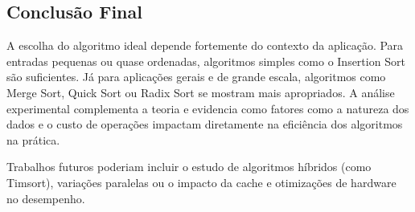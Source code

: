 \subsection*{Conclusão Final}

A escolha do algoritmo ideal depende fortemente do contexto da aplicação. Para entradas pequenas ou quase ordenadas, algoritmos simples como o Insertion Sort são suficientes. Já para aplicações gerais e de grande escala, algoritmos como Merge Sort, Quick Sort ou Radix Sort se mostram mais apropriados. A análise experimental complementa a teoria e evidencia como fatores como a natureza dos dados e o custo de operações impactam diretamente na eficiência dos algoritmos na prática.

Trabalhos futuros poderiam incluir o estudo de algoritmos híbridos (como Timsort), variações paralelas ou o impacto da cache e otimizações de hardware no desempenho.

